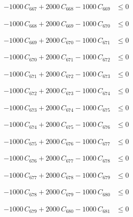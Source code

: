 \documentclass[a4paper,11pt]{article}
\begin{document}
\begin{align}
-1000\,C_{667} + 2000\,C_{668} - 1000\,C_{669} &\leq 0 \nonumber
\end{align}

\begin{align}
-1000\,C_{668} + 2000\,C_{669} - 1000\,C_{670} &\leq 0 \nonumber
\end{align}

\begin{align}
-1000\,C_{669} + 2000\,C_{670} - 1000\,C_{671} &\leq 0 \nonumber
\end{align}

\begin{align}
-1000\,C_{670} + 2000\,C_{671} - 1000\,C_{672} &\leq 0 \nonumber
\end{align}

\begin{align}
-1000\,C_{671} + 2000\,C_{672} - 1000\,C_{673} &\leq 0 \nonumber
\end{align}

\begin{align}
-1000\,C_{672} + 2000\,C_{673} - 1000\,C_{674} &\leq 0 \nonumber
\end{align}

\begin{align}
-1000\,C_{673} + 2000\,C_{674} - 1000\,C_{675} &\leq 0 \nonumber
\end{align}

\begin{align}
-1000\,C_{674} + 2000\,C_{675} - 1000\,C_{676} &\leq 0 \nonumber
\end{align}

\begin{align}
-1000\,C_{675} + 2000\,C_{676} - 1000\,C_{677} &\leq 0 \nonumber
\end{align}

\begin{align}
-1000\,C_{676} + 2000\,C_{677} - 1000\,C_{678} &\leq 0 \nonumber
\end{align}

\begin{align}
-1000\,C_{677} + 2000\,C_{678} - 1000\,C_{679} &\leq 0 \nonumber
\end{align}

\begin{align}
-1000\,C_{678} + 2000\,C_{679} - 1000\,C_{680} &\leq 0 \nonumber
\end{align}

\begin{align}
-1000\,C_{679} + 2000\,C_{680} - 1000\,C_{681} &\leq 0 \nonumber
\end{align}
\end{document}
